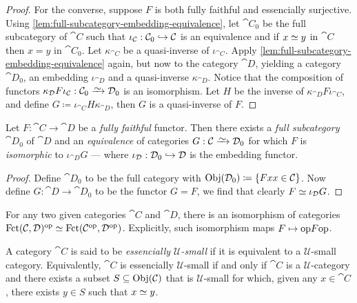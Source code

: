 \begin{proof}
For the converse, suppose \(F\) is both fully faithful and essencially
surjective. Using \cref{lem:full-subcategory-embedding-equivalence}, let
\(\cat C_0\) be the full subcategory of \(\cat C\) such that
\(\iota_{\mathcal C}: \mathcal C_0 \hookrightarrow \mathcal C\) is an equivalence and if \(x \simeq y\)
in \(\cat C\) then \(x = y\) in \(\cat C_0\). Let \(\kappa_{\cat C}\) be a
quasi-inverse of \(\iota_{\cat C}\). Apply
\cref{lem:full-subcategory-embedding-equivalence} again, but now to the category
\(\cat D\), yielding a category \(\cat D_0\), an embedding \(\iota_{\cat D}\)
and a quasi-inverse \(\kappa_{\cat D}\). Notice that the composition of functors
\(\kappa_{\cat D} F \iota_{\cat C}: \cat C_0 \isoto \cat D_0\) is an
isomorphism. Let \(H\) be the inverse of \(\kappa_{\cat D} F \iota_{\cat C}\),
and define \(G \coloneq \iota_{\cat C} H \kappa_{\cat D}\), then \(G\) is a
quasi-inverse of \(F\).
\end{proof}

\begin{corollary}
\label{cor:fully-faithful-induces-equivalence-to-full-subcategory}
Let \(F: \cat C \to \cat D\) be a \emph{fully faithful} functor. Then there
exists a \emph{full subcategory} \(\cat D_0\) of \(\cat D\) and an
\emph{equivalence} of categories \(G: \cat C \isoto \cat D_0\) for which \(F\)
is \emph{isomorphic} to \(\iota_{\cat D} G\) --- where
\(\iota_{\mathcal D}: \mathcal D_0 \hookrightarrow \mathcal D\) is the embedding functor.
\end{corollary}

\begin{proof}
Define \(\cat D_0\) to be the full category with
\(\operatorname{Obj}(\mathcal D_0) \coloneq \{F x \relax x \in \mathcal C\}\). Now define
\(G: \cat D \to \cat D_0\) to be the functor \(G = F\), we find that clearly
\(F \simeq \iota_{\mathcal D} G\).
\end{proof}

\begin{example}
\label{exp:equivalence-category-functor-opposite}
For any two given categories \(\cat C\) and \(\cat D\), there is an isomorphism
of categories \(\operatorname{Fct}(\mathcal C, \mathcal D)^{\mathrm{op}} \simeq \operatorname{Fct}(\mathcal C^{\mathrm{op}}, \mathcal
D^{\mathrm{op}})\). Explicitly, such isomorphism maps \(F \mapsto \mathrm{op} F \mathrm{op}\).
\end{example}

\begin{definition}
\label{def:essencially-U-small}
A category \(\cat C\) is said to be \emph{essencially \(\mathcal{U}\)-small} if
it is equivalent to a \(\mathcal{U}\)-small category. Equivalently, \(\cat C\)
is essencially \(\mathcal{U}\)-small if and only if \(\cat C\) is a
\(\mathcal{U}\)-category and there exists a subset \(S \subseteq \operatorname{Obj}(\mathcal C)\)
that is \(\mathcal{U}\)-small for which, given any \(x \in \cat C\), there
exists \(y \in S\) such that \(x \simeq y\).
\end{definition}

